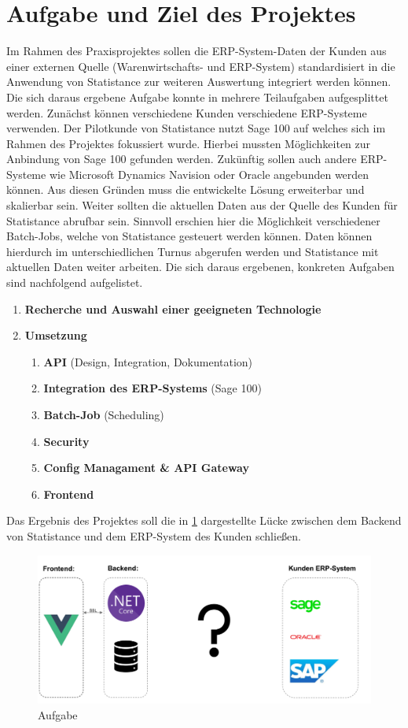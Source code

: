 \section{Aufgabe und Ziel des Projektes}
Im Rahmen des Praxisprojektes sollen die ERP-System-Daten der Kunden aus einer externen Quelle (Warenwirtschafts- und ERP-System) standardisiert in die Anwendung von Statistance zur weiteren Auswertung integriert werden können.
Die sich daraus ergebene Aufgabe konnte in mehrere Teilaufgaben aufgesplittet werden. Zunächst können verschiedene Kunden verschiedene ERP-Systeme verwenden. Der Pilotkunde von Statistance nutzt Sage 100 auf welches sich im Rahmen des Projektes fokussiert wurde. Hierbei mussten Möglichkeiten zur Anbindung von Sage 100 gefunden werden. Zukünftig sollen auch andere ERP-Systeme wie Microsoft Dynamics Navision oder Oracle angebunden werden können. Aus diesen Gründen muss die entwickelte Lösung erweiterbar und skalierbar sein. Weiter sollten die aktuellen Daten aus der Quelle des Kunden für Statistance abrufbar sein. Sinnvoll erschien hier die Möglichkeit verschiedener Batch-Jobs, welche von Statistance gesteuert werden können. Daten können hierdurch im unterschiedlichen Turnus abgerufen werden und Statistance mit aktuellen Daten weiter arbeiten. Die sich daraus ergebenen, konkreten Aufgaben sind nachfolgend aufgelistet.
\begin{enumerate}
\item \textbf{Recherche und Auswahl einer geeigneten Technologie}
\item \textbf{Umsetzung} 
\begin{enumerate}
    \item \textbf{API} (Design, Integration, Dokumentation)
    \item \textbf{Integration des ERP-Systems} (Sage 100)
    \item \textbf{Batch-Job} (Scheduling)
    \item \textbf{Security}
    \item \textbf{Config Managament \& API Gateway}
    \item \textbf{Frontend} 
\end{enumerate}
\end{enumerate}

Das Ergebnis des Projektes soll die in \ref{fig:task} dargestellte Lücke zwischen dem Backend von Statistance und dem ERP-System des Kunden schließen.
\begin{figure}[!h]
\centering
\includegraphics[width=15cm]{images/01_introduction/Aufgabe.PNG}
\caption{Aufgabe}
\label{fig:task}
\end{figure}